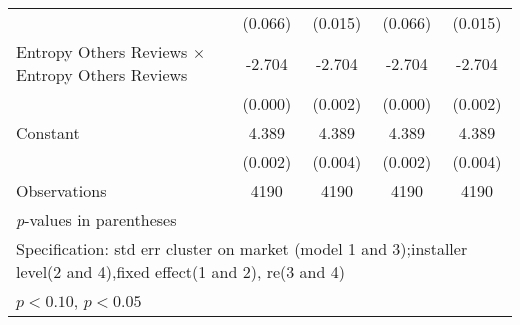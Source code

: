 {\begin{tabular}{l*{4}{c}}
                    &     (0.066)       &     (0.015)       &     (0.066)       &     (0.015)       \\
[1em]
Entropy Others Reviews $\times$ Entropy Others Reviews&      -2.704\sym{*}&      -2.704\sym{*}&      -2.704\sym{*}&      -2.704\sym{*}\\
                    &     (0.000)       &     (0.002)       &     (0.000)       &     (0.002)       \\
[1em]
Constant            &       4.389\sym{*}&       4.389\sym{*}&       4.389\sym{*}&       4.389\sym{*}\\
                    &     (0.002)       &     (0.004)       &     (0.002)       &     (0.004)       \\
\hline
Observations        &        4190       &        4190       &        4190       &        4190       \\
\hline\hline
\multicolumn{5}{l}{\footnotesize \textit{p}-values in parentheses}\\
\multicolumn{5}{l}{\footnotesize Specification: std err cluster on market (model 1 and 3);installer level(2 and 4),fixed effect(1 and 2), re(3 and 4) }\\
\multicolumn{5}{l}{\footnotesize \sym{+} \(p<0.10\), \sym{*} \(p<0.05\)}\\
\end{tabular}
}
